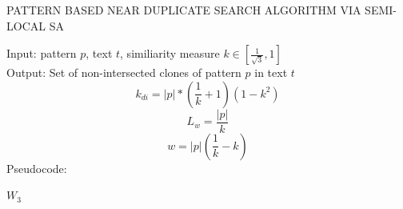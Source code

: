\begin{algorithm}[!t]
\caption{PATTERN BASED NEAR DUPLICATE
SEARCH ALGORITHM VIA SEMI-LOCAL SA}
\label{alg:patternMathing1}
Input: pattern $p$, text $t$, similiarity measure $k \in  [ \frac{1}{\sqrt{3}} ,1  ]$\\
Output: Set of non-intersected clones of pattern $p$ in text $t$
\begin{equation}
    k_{di}=|p|*(\frac{1}{k}+1)(1-k^2)
\end{equation}
\begin{equation}
 L_{w} = \frac{|p|} {k}
\end{equation}
\begin{equation}
  w = |p|(\frac{1}{k} - k)
\end{equation}
Pseudocode:
\begin{algorithmic}[1]
\ENDIF
\ENDFOR
\RETURN $W_3$
\end{algorithmic}
\end{algorithm}

